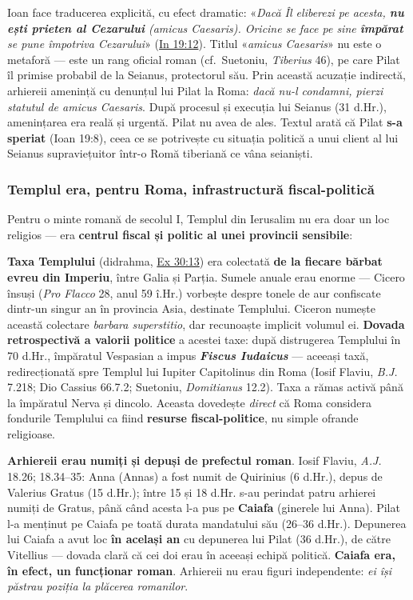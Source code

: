 \documentclass[12pt,a4paper,twoside,openany]{book}
\begin{document}
Ioan face traducerea explicită, cu efect dramatic: «\textit{Dacă Îl eliberezi pe acesta, \textbf{nu ești prieten al Cezarului} (\textit{amicus Caesaris}). Oricine se face pe sine \textbf{împărat} se pune împotriva Cezarului}» (\href{https://bibliaortodoxa.ro/carte.php?id=35\&cap=19\#12}{In 19:12}). Titlul «\textit{amicus Caesaris}» nu este o metaforă — este un rang oficial roman (cf.\ Suetoniu, \textit{Tiberius} 46), pe care Pilat îl primise probabil de la Seianus, protectorul său. Prin această acuzație indirectă, arhiereii amenință cu denunțul lui Pilat la Roma: \textit{dacă nu-l condamni, pierzi statutul de amicus Caesaris}. După procesul și execuția lui Seianus (31 d.Hr.), amenințarea era reală și urgentă. Pilat nu avea de ales. Textul arată că Pilat \textbf{s-a speriat} (Ioan 19:8), ceea ce se potrivește cu situația politică a unui client al lui Seianus supraviețuitor într-o Romă tiberiană ce vâna seianiști.

\subsubsection*{Templul era, pentru Roma, infrastructură fiscal-politică}

Pentru o minte romană de secolul I, Templul din Ierusalim nu era doar un loc religios — era \textbf{centrul fiscal și politic al unei provincii sensibile}:

\textbf{Taxa Templului} (didrahma, \href{https://bibliaortodoxa.ro/carte.php?id=2\&cap=30\#13}{Ex 30:13}) era colectată \textbf{de la fiecare bărbat evreu din Imperiu}, între Galia și Parția. Sumele anuale erau enorme — Cicero însuși (\textit{Pro Flacco} 28, anul 59 î.Hr.) vorbește despre tonele de aur confiscate dintr-un singur an în provincia Asia, destinate Templului. Ciceron numește această colectare \textit{barbara superstitio}, dar recunoaște implicit volumul ei. \textbf{Dovada retrospectivă a valorii politice} a acestei taxe: după distrugerea Templului în 70 d.Hr., împăratul Vespasian a impus \textbf{\textit{Fiscus Iudaicus}} — aceeași taxă, redirecționată spre Templul lui Iupiter Capitolinus din Roma (Iosif Flaviu, \textit{B.J.} 7.218; Dio Cassius 66.7.2; Suetoniu, \textit{Domitianus} 12.2). Taxa a rămas activă până la împăratul Nerva și dincolo. Aceasta dovedește \textit{direct} că Roma considera fondurile Templului ca fiind \textbf{resurse fiscal-politice}, nu simple ofrande religioase.

\textbf{Arhiereii erau numiți și depuși de prefectul roman}. Iosif Flaviu, \textit{A.J.} 18.26; 18.34--35: Anna (Annas) a fost numit de Quirinius (6 d.Hr.), depus de Valerius Gratus (15 d.Hr.); între 15 și 18 d.Hr. s-au perindat patru arhierei numiți de Gratus, până când acesta l-a pus pe \textbf{Caiafa} (ginerele lui Anna). Pilat l-a menținut pe Caiafa pe toată durata mandatului său (26--36 d.Hr.). Depunerea lui Caiafa a avut loc \textbf{în același an} cu depunerea lui Pilat (36 d.Hr.), de către Vitellius — dovada clară că cei doi erau în aceeași echipă politică. \textbf{Caiafa era, în efect, un funcționar roman}. Arhiereii nu erau figuri independente: \textit{ei își păstrau poziția la plăcerea romanilor}.
\end{document}
